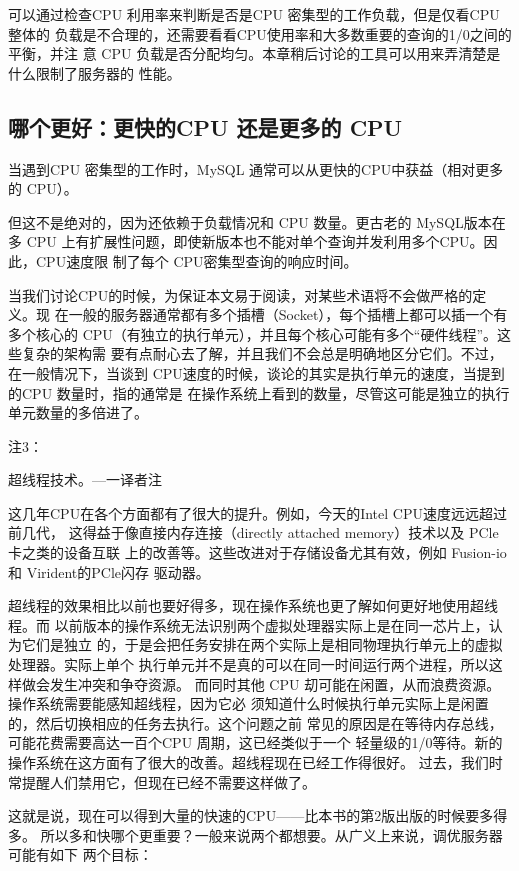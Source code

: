 可以通过检查CPU 利用率来判断是否是CPU 密集型的工作负载，但是仅看CPU 整体的
负载是不合理的，还需要看看CPU使用率和大多数重要的查询的1/0之间的平衡，并注
意 CPU 负载是否分配均匀。本章稍后讨论的工具可以用来弄清楚是什么限制了服务器的
性能。

\subsection{哪个更好：更快的CPU 还是更多的 CPU}
当遇到CPU 密集型的工作时，MySQL 通常可以从更快的CPU中获益（相对更多的
CPU）。

但这不是绝对的，因为还依赖于负载情况和 CPU 数量。更古老的 MySQL版本在多 CPU
上有扩展性问题，即使新版本也不能对单个查询并发利用多个CPU。因此，CPU速度限
制了每个 CPU密集型查询的响应时间。

当我们讨论CPU的时候，为保证本文易于阅读，对某些术语将不会做严格的定义。现
在一般的服务器通常都有多个插槽（Socket），每个插槽上都可以插一个有多个核心的
CPU（有独立的执行单元），并且每个核心可能有多个“硬件线程”。这些复杂的架构需
要有点耐心去了解，并且我们不会总是明确地区分它们。不过，在一般情况下，当谈到
CPU速度的时候，谈论的其实是执行单元的速度，当提到的CPU 数量时，指的通常是
在操作系统上看到的数量，尽管这可能是独立的执行单元数量的多倍进了。

注3：

超线程技术。—一译者注

这几年CPU在各个方面都有了很大的提升。例如，今天的Intel CPU速度远远超过前几代，
这得益于像直接内存连接（directly attached memory）技术以及 PCle卡之类的设备互联
上的改善等。这些改进对于存储设备尤其有效，例如 Fusion-io 和 Virident的PCle闪存
驱动器。

超线程的效果相比以前也要好得多，现在操作系统也更了解如何更好地使用超线程。而
以前版本的操作系统无法识别两个虚拟处理器实际上是在同一芯片上，认为它们是独立
的，于是会把任务安排在两个实际上是相同物理执行单元上的虚拟处理器。实际上单个
执行单元并不是真的可以在同一时间运行两个进程，所以这样做会发生冲突和争夺资源。
而同时其他 CPU 刧可能在闲置，从而浪费资源。操作系统需要能感知超线程，因为它必
须知道什么时候执行单元实际上是闲置的，然后切换相应的任务去执行。这个问题之前
常见的原因是在等待内存总线，可能花费需要高达一百个CPU 周期，这已经类似于一个
轻量级的1/0等待。新的操作系统在这方面有了很大的改善。超线程现在已经工作得很好。
过去，我们时常提醒人们禁用它，但现在已经不需要这样做了。

这就是说，现在可以得到大量的快速的CPU——比本书的第2版出版的时候要多得多。
所以多和快哪个更重要？一般来说两个都想要。从广义上来说，调优服务器可能有如下
两个目标：

